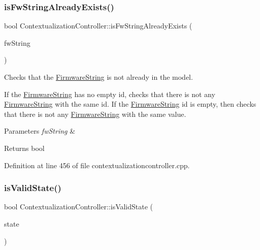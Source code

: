 \subsubsection{\texorpdfstring{is\+Fw\+String\+Already\+Exists()}{isFwStringAlreadyExists()}}
{\footnotesize\ttfamily bool Contextualization\+Controller\+::is\+Fw\+String\+Already\+Exists (\begin{DoxyParamCaption}\item[{\mbox{\hyperlink{classFirmwareString}{Firmware\+String}} \&}]{fw\+String }\end{DoxyParamCaption})\hspace{0.3cm}{\ttfamily [protected]}}



Checks that the \mbox{\hyperlink{classFirmwareString}{Firmware\+String}} is not already in the model. 

If the \mbox{\hyperlink{classFirmwareString}{Firmware\+String}} has no empty id, checks that there is not any \mbox{\hyperlink{classFirmwareString}{Firmware\+String}} with the same id. If the \mbox{\hyperlink{classFirmwareString}{Firmware\+String}} id is empty, then checks that there is not any \mbox{\hyperlink{classFirmwareString}{Firmware\+String}} with the same value. 
\begin{DoxyParams}{Parameters}
{\em fw\+String} & \\
\hline
\end{DoxyParams}
\begin{DoxyReturn}{Returns}
bool 
\end{DoxyReturn}


Definition at line 456 of file contextualizationcontroller.\+cpp.

\mbox{\label{classContextualizationController_a0d726ece69d0876729c1c801f9c25230}} 
\subsubsection{\texorpdfstring{is\+Valid\+State()}{isValidState()}}
{\footnotesize\ttfamily bool Contextualization\+Controller\+::is\+Valid\+State (\begin{DoxyParamCaption}\item[{Q\+String \&}]{state }\end{DoxyParamCaption})\hspace{0.3cm}{\ttfamily [protected]}}



